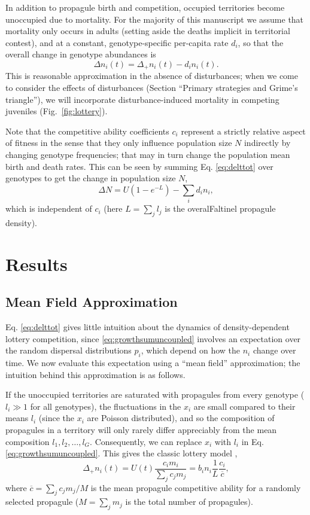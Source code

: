 \documentclass[11pt]{article}
\begin{document}
In addition to propagule birth and competition, occupied territories become unoccupied due to mortality. For the majority of this manuscript we assume that mortality only occurs in adults (setting aside the deaths implicit in territorial contest), and at a constant, genotype-specific per-capita rate $d_i$, so that the overall change in genotype abundances is
\begin{equation}
\Delta n_i(t)=\Delta_+ n_i(t)-d_i n_i(t). \label{eq:delttot}
\end{equation}
This is reasonable approximation in the absence of disturbances; when we come to consider the effects of disturbances (Section ``Primary strategies and Grime's triangle''), we will incorporate disturbance-induced mortality in competing juveniles (Fig.~\ref{fig:lottery}). 

Note that the competitive ability coefficients $c_i$ represent a strictly relative aspect of fitness in the sense that they only influence population size $N$ indirectly by changing genotype frequencies; that may in turn change the population mean birth and death rates. This can be seen by summing Eq. \eqref{eq:delttot} over genotypes to get the  change in population size $N$, 
\begin{equation}
\Delta N=U(1-e^{-L})-\sum_i d_i n_i,\label{eq:deltN}
\end{equation}
which is independent of $c_i$ (here $L=\sum_j l_j$ is the overalFaltinel propagule density).

\section*{Results}

\subsection*{Mean Field Approximation}

Eq. \eqref{eq:delttot} gives little intuition about the dynamics of density-dependent lottery competition, since \eqref{eq:growthsumuncoupled} involves an expectation over the random dispersal distributions $p_i$, which depend on how the $n_i$ change over time. We now evaluate this expectation using a ``mean field'' approximation; the intuition behind this approximation is as follows.

If the unoccupied territories are saturated with propagules from every genotype ($l_i\gg 1$ for all genotypes), the fluctuations in the $x_i$ are small compared to their means $l_i$ (since the $x_i$ are Poisson distributed), and so the composition of propagules in a territory will only rarely differ appreciably from the mean composition $l_1,l_2,\ldots,l_G$. Consequently, we can replace $x_i$ with $l_i$ in Eq. \eqref{eq:growthsumuncoupled}. This gives the classic lottery model \citep{chesson_1981},
\begin{equation}
\Delta_+ n_i(t)=U(t)\frac{c_i m_i}{\sum_j c_j m_j}= b_i n_i\frac{1}{L}\frac{c_i}{\overline{c}}, \label{eq:lottery}
\end{equation}
where $\overline{c}=\sum_j c_j m_j/M$ is the mean propagule competitive ability for a randomly selected propagule ($M=\sum_j m_j$ is the total number of propagules). 
\end{document}
